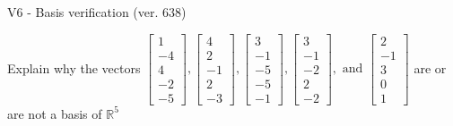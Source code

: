 \begin{exercise}
  \begin{exerciseTitle}V6 - Basis verification (ver. 638)\end{exerciseTitle}
  \begin{exerciseStatement}
    Explain why the vectors \(\left[\begin{array}{r}
1 \\
-4 \\
4 \\
-2 \\
-5
\end{array}\right] , \left[\begin{array}{r}
4 \\
2 \\
-1 \\
2 \\
-3
\end{array}\right] , \left[\begin{array}{r}
3 \\
-1 \\
-5 \\
-5 \\
-1
\end{array}\right] , \left[\begin{array}{r}
3 \\
-1 \\
-2 \\
2 \\
-2
\end{array}\right] , \text{ and } \left[\begin{array}{r}
2 \\
-1 \\
3 \\
0 \\
1
\end{array}\right]\) are or are not a basis of \(\mathbb{R}^5\)	



\end{exerciseStatement}
\end{exercise}

